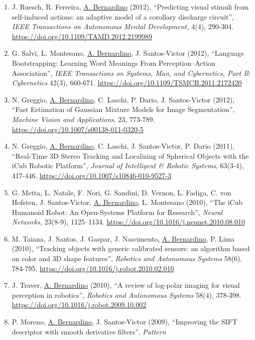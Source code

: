 \documentclass[
]{article}
\begin{document}
\begin{enumerate}
  \emph{Adaptive Behavior,} 21(6),452-464.
  \url{https://doi.org/10.1177/1059712313492176}
\item
  J. Ruesch, R. Ferreira, \ul{A. Bernardino} (2012), ``Predicting visual
  stimuli from self-induced actions: an adaptive model of a corollary
  discharge circuit'', \emph{IEEE Transactions on Autonomous Mental
  Development,} 4(4), 290-304.
  \url{https://doi.org/10.1109/TAMD.2012.2199989}
\item
  G. Salvi, L. Montesano, \ul{A. Bernardino}, J. Santos-Victor (2012),
  ``Language Bootstrapping: Learning Word Meanings From
  Perception--Action Association'', \emph{IEEE Transactions on Systems,
  Man, and Cybernetics, Part B: Cybernetics} 42(3), 660-671.
  \url{https://doi.org/10.1109/TSMCB.2011.2172420}
\item
  N. Greggio, \ul{A. Bernardino}, C. Laschi, P. Dario, J. Santos-Victor
  (2012), ``Fast Estimation of Gaussian Mixture Models for Image
  Segmentation'', \emph{Machine Vision and Applications}, 23, 773-789.
  \url{https://doi.org/10.1007/s00138-011-0320-5}
\item
  N. Greggio, \ul{A. Bernardino}, C. Laschi, J. Santos-Victor, P. Dario
  (2011), ``Real-Time 3D Stereo Tracking and Localizing of Spherical
  Objects with the iCub Robotic Platform'', \emph{Journal of Intelligent
  \& Robotic Systems}, 63(3-4), 417-446.
  \url{https://doi.org/10.1007/s10846-010-9527-3}
\item
  G. Metta, L. Natale, F. Nori, G. Sandini, D. Vernon, L. Fadiga, C. von
  Hofsten, J. Santos-Victor, \ul{A. Bernardino}, L. Montesano (2010),
  ``The iCub Humanoid Robot: An Open-Systems Platform for Research'',
  \emph{Neural Networks,} 23(8-9), 1125--1134.
  \url{https://doi.org/10.1016/j.neunet.2010.08.010}
\item
  M. Taiana, J. Santos, J. Gaspar, J. Nascimento, \ul{A. Bernardino}, P.
  Lima (2010), ``Tracking objects with generic calibrated sensors: an
  algorithm based on color and 3D shape features'', \emph{Robotics and
  Autonomous Systems} 58(6), 784-795.
  \url{https://doi.org/10.1016/j.robot.2010.02.010}
\item
  J. Traver, \ul{A. Bernardino} (2010), ``A review of log-polar imaging
  for visual perception in robotics'', \emph{Robotics and Autonomous
  Systems} 58(4), 378-398.
  \url{https://doi.org/10.1016/j.robot.2009.10.002}
\item
  P. Moreno, \ul{A. Bernardino}, J. Santos-Victor (2009), ``Improving
  the SIFT descriptor with smooth derivative filters'', \emph{Pattern
}
\end{enumerate}
\end{document}
